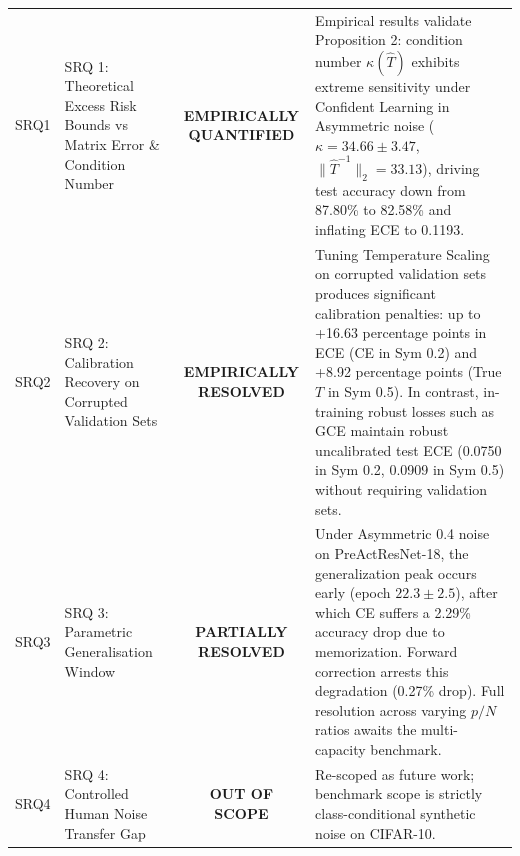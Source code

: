 \begin{table}[t]
\begin{tabular}{lp{4.2cm}cp{7.5cm}}
SRQ1 & SRQ 1: Theoretical Excess Risk Bounds vs Matrix Error \& Condition Number & \textbf{EMPIRICALLY QUANTIFIED} & Empirical results validate Proposition 2: condition number $\kappa(\hat{T})$ exhibits extreme sensitivity under Confident Learning in Asymmetric noise ($\kappa = 34.66 \pm 3.47$, $\|\hat{T}^{-1}\|_2 = 33.13$), driving test accuracy down from 87.80\% to 82.58\% and inflating ECE to 0.1193. \\
SRQ2 & SRQ 2: Calibration Recovery on Corrupted Validation Sets & \textbf{EMPIRICALLY RESOLVED} & Tuning Temperature Scaling on corrupted validation sets produces significant calibration penalties: up to +16.63 percentage points in ECE (CE in Sym 0.2) and +8.92 percentage points (True $T$ in Sym 0.5). In contrast, in-training robust losses such as GCE maintain robust uncalibrated test ECE (0.0750 in Sym 0.2, 0.0909 in Sym 0.5) without requiring validation sets. \\
SRQ3 & SRQ 3: Parametric Generalisation Window & \textbf{PARTIALLY RESOLVED} & Under Asymmetric 0.4 noise on PreActResNet-18, the generalization peak occurs early (epoch $22.3 \pm 2.5$), after which CE suffers a 2.29\% accuracy drop due to memorization. Forward correction arrests this degradation (0.27\% drop). Full resolution across varying $p/N$ ratios awaits the multi-capacity benchmark. \\
SRQ4 & SRQ 4: Controlled Human Noise Transfer Gap & \textbf{OUT OF SCOPE} & Re-scoped as future work; benchmark scope is strictly class-conditional synthetic noise on CIFAR-10. \\
\hline
\end{tabular}
\end{table}
